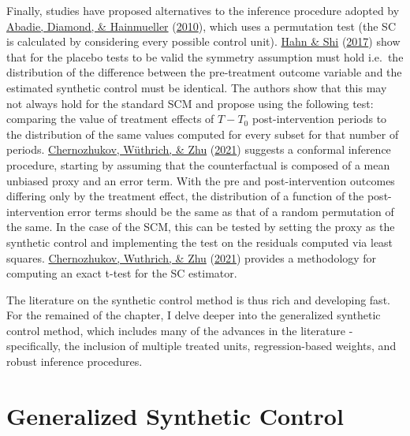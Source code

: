 \documentclass[12pt,nobind, a4paper]{reedthesis}
\begin{document}
 Finally, studies have proposed alternatives to the inference procedure adopted by \protect\hyperlink{ref-abadie_synthetic_2010}{Abadie, Diamond, \& Hainmueller} (\protect\hyperlink{ref-abadie_synthetic_2010}{2010}), which uses a permutation test (the SC is calculated by considering every possible control unit). \protect\hyperlink{ref-hahn_synthetic_2017}{Hahn \& Shi} (\protect\hyperlink{ref-hahn_synthetic_2017}{2017}) show that for the placebo tests to be valid the symmetry assumption must hold i.e.~the distribution of the difference between the pre-treatment outcome variable and the estimated synthetic control must be identical. The authors show that this may not always hold for the standard SCM and propose using the following test: comparing the value of treatment effects of \(T-T_{0}\) post-intervention periods to the distribution of the same values computed for every subset for that number of periods. \protect\hyperlink{ref-chernozhukov_exact_2021}{Chernozhukov, Wüthrich, \& Zhu} (\protect\hyperlink{ref-chernozhukov_exact_2021}{2021}) suggests a conformal inference procedure, starting by assuming that the counterfactual is composed of a mean unbiased proxy and an error term. With the pre and post-intervention outcomes differing only by the treatment effect, the distribution of a function of the post-intervention error terms should be the same as that of a random permutation of the same. In the case of the SCM, this can be tested by setting the proxy as the synthetic control and implementing the test on the residuals computed via least squares. \protect\hyperlink{ref-chernozhukov_t-test_2021}{Chernozhukov, Wuthrich, \& Zhu} (\protect\hyperlink{ref-chernozhukov_t-test_2021}{2021}) provides a methodology for computing an exact t-test for the SC estimator.
 \linebreak

 The literature on the synthetic control method is thus rich and developing fast. For the remained of the chapter, I delve deeper into the generalized synthetic control method, which includes many of the advances in the literature - specifically, the inclusion of multiple treated units, regression-based weights, and robust inference procedures.

 \hypertarget{gscm}{%
 \section{Generalized Synthetic Control}\label{gscm}}
\end{document}

